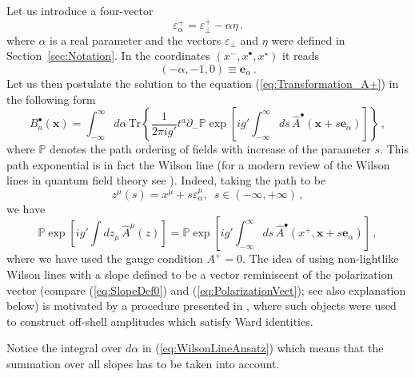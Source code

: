 \documentclass[english,american]{article}
\begin{document}
Let us introduce a four-vector
\begin{equation}
\varepsilon_{\alpha}^{+}=\varepsilon_{\perp}^{+}-\alpha\eta\,.\label{eq:SlopeDef0}
\end{equation}
where $\alpha$ is a real parameter and the vectors $\varepsilon_{\perp}$ and $\eta$ were defined in Section~\ref{sec:Notation}. In the coordinates $\left(x^{-},x^{\bullet},x^{\star}\right)$
it reads
\begin{equation}
\left(-\alpha,-1,0\right)\equiv\mathbf{e}_{\alpha}\,.\label{eq:SlopeDef}
\end{equation}
Let us then postulate the solution to the equation (\ref{eq:Transformation_A+})
in the following form
\begin{equation}
B_{a}^{\bullet}\left(\mathbf{x}\right)=\int_{-\infty}^{\infty}d\alpha\,\mathrm{Tr}\left\{ \frac{1}{2\pi ig'}t^{a}\partial_{-}\mathbb{P}\exp\left[ig'\int_{-\infty}^{\infty}ds\,\hat{A}^{\bullet}\left(\mathbf{x}+s\mathbf{e}_{\alpha}\right)\right]\right\} \, ,\label{eq:WilsonLineAnsatz}
\end{equation}
where $\mathbb{P}$ denotes the path ordering of fields with increase of the parameter $s$. This path exponential is in fact the Wilson line (for a modern
review of the Wilson lines in quantum field theory see \citep{Cherednikov2014}).
Indeed, taking the path to be
\begin{equation}
z^{\mu}\left(s\right)=x^{\mu}+s\varepsilon_{\alpha}^{\mu},\,\,\, s\in\left(-\infty,+\infty\right)\, ,\label{eq:path}
\end{equation}
we have
\begin{equation}
\mathbb{P}\exp\left[ig'\int dz_{\mu}\,\hat{A}^{\mu}\left(z\right)\right]=\mathbb{P}\exp\left[ig'\int_{-\infty}^{\infty}ds\,\hat{A}^{\bullet}\left(x^{+},\mathbf{x}+s\mathbf{e}_{\alpha}\right)\right]\,,
\end{equation}
where we have used the gauge condition $A^{+}=0$. The idea of using
non-lightlike Wilson lines with a slope defined to be a vector reminiscent of the polarization vector (compare (\ref{eq:SlopeDef0}) and (\ref{eq:PolarizationVect});
see also explanation below) is motivated by a procedure presented in \citep{Kotko2014a}, where 
such objects were used to construct off-shell amplitudes which satisfy
Ward identities. 

Notice the integral over $d\alpha$ in (\ref{eq:WilsonLineAnsatz})
which means that the summation over all slopes has to be taken into
account. 
\end{document}
